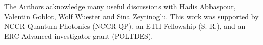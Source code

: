 \documentclass[prl,twocolumn,10pt,showpacs,superscriptaddress,longbibliography,footnoteinbib]{revtex4-1}
\begin{document}
\begin{acknowledgments}
The Authors acknowledge many useful discussions with Hadis Abbaspour, Valentin Goblot, Wolf Wuester and Sina Zeytinoglu. This work was supported by NCCR Quantum Photonics (NCCR QP), an ETH Fellowship (S. R.), and an ERC Advanced investigator grant (POLTDES).
\end{acknowledgments}

%
%

%
\end{document}
